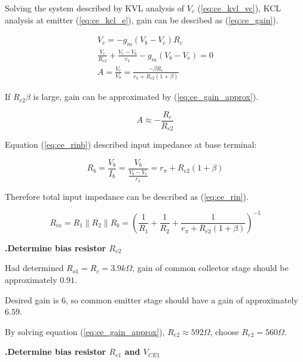 \documentclass[a4paper,notitlepage,10pt]{report}
\newcommand{\tab}{\hspace{0.75cm}}
\newcommand{\fontSubHeading}{\fontsize{10pt}{11pt}\selectfont}
\newcounter{sections}
\newcounter{subsections}[sections]
\begin{document}
\begin{multicols}{2}
Solving the system described by KVL analysis of $V_c$ (\ref{eq:ce_kvl_vc}), KCL analysis at emitter (\ref{eq:ce_kcl_e}), gain can be descibed as (\ref{eq:ce_gain}).
\parskip=0pt

\begin{gather}
	\label{eq:ce_kvl_vc}
	V_c = -g_m \left(V_b - V_e\right) R_c
	\\\label{eq:ce_kcl_e}
	\frac{V_e}{R_{e2}} + \frac{V_e - V_b}{r_\pi} - g_m\left(V_b - V_e\right) = 0
	\\\label{eq:ce_gain}
	A = \frac{V_c}{V_b} = \frac{-\beta R_c}{r_\pi + R_{e2}\left( 1 + \beta \right)}
\end{gather}
\parskip=6pt

If $R_{e2}\beta$ is large, gain can be approximated by (\ref{eq:ce_gain_approx}).
\parskip=0pt

\begin{equation}
	\label{eq:ce_gain_approx}
	A \approx -\frac{R_c}{R_{e2}}
\end{equation}
\parskip=6pt

Equation (\ref{eq:ce_rinb}) described input impedance at base terminal:
\parskip=0pt

\begin{equation}
	\label{eq:ce_rinb}
	R_b = \frac{V_b}{I_b} = \frac{V_b}{\frac{V_b - V_e}{r_\pi}} = r_\pi + R_{e2}\left( 1 + \beta \right)
\end{equation}
\parskip=6pt

Therefore total input impedance can be described as (\ref{eq:ce_rin}).
\parskip=0pt

\begin{equation}
	\label{eq:ce_rin}
	R_{in} = R_1 \| R_2 \| R_b = \left(\frac{1}{R_1} + \frac{1}{R_2} + \frac{1}{r_\pi + R_{e2}\left( 1 + \beta \right)}\right)^{-1}
\end{equation}
\parskip=6pt

\fontSubHeading
{}
\textbf{.\tab Determine bias resistor $R_{e2}$}

Had determined $R_{o1} = R_c = 3.9k\Omega$, gain of common collector stage should be approximately $0.91$.

Desired gain is $6$, so common emitter stage should have a gain of approximately $6.59$.

By solving equation (\ref{eq:ce_gain_approx}), $R_{e2} \approx 592\Omega$, choose $R_{e2} = 560\Omega$.

\fontSubHeading
{}
\textbf{.\tab Determine bias resistor $R_{e1}$ and $V_{CE1}$}


\end{multicols}
\end{document}
